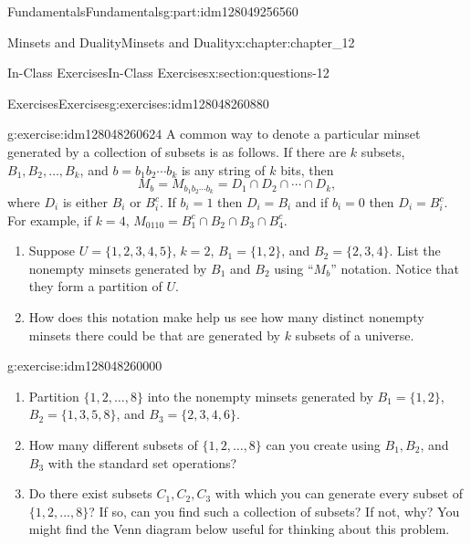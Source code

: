 \documentclass[oneside,10pt,]{book}
\numberwithin{equation}{section}
\begin{document}
\begin{partptx}{Fundamentals}{}{Fundamentals}{}{}{g:part:idm128049256560}
\begin{chapterptx}{Minsets and Duality}{}{Minsets and Duality}{}{}{x:chapter:chapter_12}
\begin{sectionptx}{In-Class Exercises}{}{In-Class Exercises}{}{}{x:section:questions-12}
%
%
%
\typeout{************************************************}
\typeout{************************************************}
%
\begin{exercises-subsection}{Exercises}{}{Exercises}{}{}{g:exercises:idm128048260880}
\par\medskip\noindent%
%
\begin{exercisegroup}
\begin{divisionexerciseeg}{1}{}{}{g:exercise:idm128048260624}%
A common way to denote a particular minset generated by a collection of subsets is as follows.  If there are \(k\) subsets, \(B_1, B_2, \dots ,B_k\), and \(b=b_1b_2\cdots b_k\) is any string of \(k\) bits, then%
\begin{equation*}
M_b =  M_{b_1b_2\cdots b_k} = D_1 \cap D_2 \cap \cdots \cap D_k,
\end{equation*}
where \(D_i\) is either \(B_i\) or \(B_i^c\).  If \(b_i = 1\) then \(D_i =B_i\) and if \(b_i=0\) then \(D_i=B_i^c\).  For example, if \(k=4\), \(M_{0110} = B_1^c \cap B_2 \cap B_3 \cap B_4^c\).%
\begin{enumerate}[label=(\alph*)]
\item{}Suppose \(U=\{1, 2, 3, 4, 5\}\), \(k=2\), \(B_1= \{1, 2\}\), and \(B_2 = \{2,3,4\}\).  List the nonempty minsets generated by \(B_1\) and \(B_2\) using ``\(M_b\)'' notation. Notice that they form a partition of \(U\).%
\item{}How does this notation make help us see how many distinct nonempty minsets there could be that are generated by \(k\) subsets of a universe.%
\end{enumerate}
%
\end{divisionexerciseeg}%
\begin{divisionexerciseeg}{2}{}{}{g:exercise:idm128048260000}%
%
\begin{enumerate}[label=(\alph*)]
\item{}Partition \(\{1, 2,  \dots, 8\}\) into the nonempty minsets generated by \(B_1= \{1, 2\}\), \(B_2 = \{1, 3, 5, 8\}\), and \(B_3 = \{2, 3, 4, 6\}\).%
\item{}How many different subsets of \(\{1, 2, \dots ,8\}\) can you create using \(B_1, B_2\), and \(B_3\) with the standard set operations?%
\item{}Do there exist subsets \(C_1, C_2, C_3\) with which you can generate every subset of \(\{1,2, . . . ,8\}\)?  If so, can you find such a collection of subsets?  If not, why?  You might find the Venn diagram below useful for thinking about this problem.%

\end{enumerate}
\end{divisionexerciseeg}
\end{exercisegroup}
\end{exercises-subsection}
\end{sectionptx}
\end{chapterptx}
\end{partptx}
\end{document}
